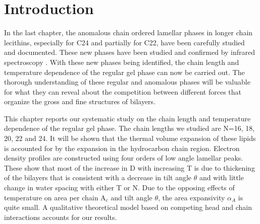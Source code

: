 \section{Introduction}

In the last chapter, the anomalous chain ordered lamellar phases
in longer chain lecithins, especially for C24 and partially for C22,
have been carefully studied and documented. These new phases have
been studied and confirmed by infrared spectroscopy \cite{Sny96}.
With these new phases being identified, the chain length and temperature 
dependence of the regular gel phase can now be carried out.  The thorough 
understanding of these regular and anomalous phases will be valuable for 
what they can reveal about the competition between different forces 
that organize the gross and fine structures of bilayers.

This chapter reports our systematic study on the chain length and temperature
dependence of the regular gel phase. The chain lengths we studied are
N=16, 18, 20, 22 and 24. It will be shown that the thermal volume expansion 
of these lipids is accounted for by the expansion in the hydrocarbon chain 
region. Electron density profiles are constructed using four orders of low 
angle lamellar peaks. These show that most of the increase in D with 
increasing T is due to thickening of the bilayers that is consistent with 
a decrease in tilt angle $\theta$ and with little change in water spacing 
with either T or N.  Due to the opposing effects of temperature on area per 
chain A$_c$ and tilt angle $\theta$, the area expansivity $\alpha_A$ is 
quite small. A qualitative theoretical model based on competing head and 
chain interactions accounts for our results.



